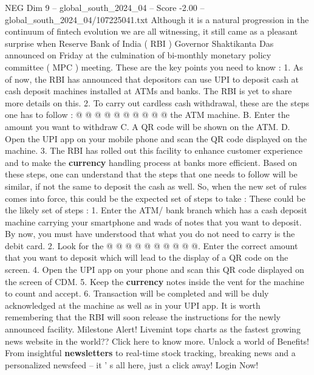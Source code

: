 \begin{textsample}{NEG Dim 9 – global\_south\_2024\_04 – Score -2.00 – global\_south\_2024\_04/107225041.txt}
Although it is a natural progression in the continuum of fintech evolution we are all witnessing, it still came as a pleasant surprise when Reserve Bank of India ( RBI ) Governor Shaktikanta Das announced on Friday at the culmination of bi-monthly monetary policy committee ( MPC ) meeting.
These are the key points you need to know : 1.
As of now, the RBI has announced that depositors can use UPI to deposit cash at cash deposit machines installed at ATMs and banks.
The RBI is yet to share more details on this. 2.
To carry out cardless cash withdrawal, these are the steps one has to follow : @ @ @ @ @ @ @ @ @ @ the ATM machine.
B.
Enter the amount you want to withdraw C.
A QR code will be shown on the ATM.
D.
Open the UPI app on your mobile phone and scan the QR code displayed on the machine. 3.
The RBI has rolled out this facility to enhance customer experience and to make the \textbf{currency} handling process at banks more efficient.
Based on these steps, one can understand that the steps that one needs to follow will be similar, if not the same to deposit the cash as well.
So, when the new set of rules comes into force, this could be the expected set of steps to take : These could be the likely set of steps : 1.
Enter the ATM/ bank branch which has a cash deposit machine carrying your smartphone and wads of notes that you want to deposit.
By now, you must have understood that what you do not need to carry is the debit card. 2.
Look for the @ @ @ @ @ @ @ @ @ @.
Enter the correct amount that you want to deposit which will lead to the display of a QR code on the screen. 4.
Open the UPI app on your phone and scan this QR code displayed on the screen of CDM. 5.
Keep the \textbf{currency} notes inside the vent for the machine to count and accept. 6.
Transaction will be completed and will be duly acknowledged at the machine as well as in your UPI app.
It is worth remembering that the RBI will soon release the instructions for the newly announced facility.
Milestone Alert!
Livemint tops charts as the fastest growing news website in the world??
Click here to know more.
Unlock a world of Benefits!
From insightful \textbf{newsletters} to real-time stock tracking, breaking news and a personalized newsfeed -- it ' s all here, just a click away!
Login Now!

\end{textsample}

